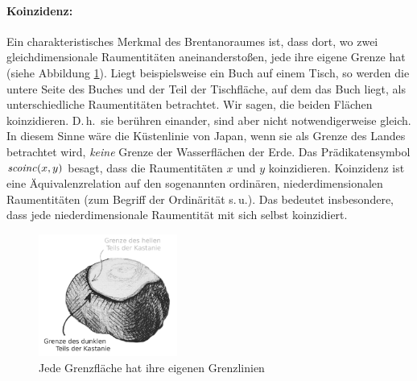     \paragraph{Koinzidenz:}
       Ein
       charakteristisches Merkmal des Brentanoraumes ist, dass dort, wo zwei gleichdimensionale Raumentitäten aneinanderstoßen, jede ihre eigene Grenze hat (siehe Abbildung \ref{fig:kastanie}).
       Liegt beispielsweise ein Buch auf einem Tisch, so werden die untere Seite des Buches und der Teil der Tischfläche, auf dem das Buch liegt, als unterschiedliche Raumentitäten betrachtet. 
       Wir sagen, die beiden Flächen %
       koinzidieren. 
       D.\,h.\ sie berühren einander, sind aber nicht notwendigerweise gleich. 
       In diesem Sinne wäre die Küstenlinie von Japan, wenn sie als Grenze des Landes betrachtet wird, \emph{keine} Grenze der Wasserflächen der Erde.
       Das Prädikatensymbol $\mathit{scoinc}(x,y)$ besagt, dass die Raumentitäten $x$ und $y$ koinzidieren.
       Koinzidenz ist eine Äquivalenzrelation auf den sogenannten ordinären, niederdimensionalen Raumentitäten (zum Begriff der Ordinärität s.\,u.). 
       Das bedeutet insbesondere, dass jede niederdimensionale Raumentität mit sich selbst koinzidiert.
           
        \begin{figure}[ht]
            \centering
            \includegraphics[height=4cm]{bearbeitet-22-04-25/kastanie.png}
            \caption{Jede Grenzfläche hat ihre eigenen Grenzlinien}
            \label{fig:kastanie}
        \end{figure}
        
       
